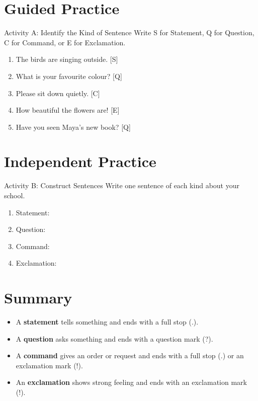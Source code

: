 \section{Guided Practice}
\begin{activitybox}{Activity A: Identify the Kind of Sentence}
Write S for Statement, Q for Question, C for Command, or E for Exclamation.
\begin{enumerate}
    \item The birds are singing outside. [S]
    \item What is your favourite colour? [Q]
    \item Please sit down quietly. [C]
    \item How beautiful the flowers are! [E]
    \item Have you seen Maya's new book? [Q]
\end{enumerate}
\end{activitybox}

\section{Independent Practice}
\begin{activitybox}{Activity B: Construct Sentences}
Write one sentence of each kind about your school.
\begin{enumerate}
    \item Statement: \underline{\hspace{10cm}}
    \item Question: \underline{\hspace{10cm}}
    \item Command: \underline{\hspace{10cm}}
    \item Exclamation: \underline{\hspace{10cm}}
\end{enumerate}
\end{activitybox}

\section{Summary}
\begin{summarybox}
    \begin{itemize}
        \item A \textbf{statement} tells something and ends with a full stop (.).
        \item A \textbf{question} asks something and ends with a question mark (?).
        \item A \textbf{command} gives an order or request and ends with a full stop (.) or an exclamation mark (!).
        \item An \textbf{exclamation} shows strong feeling and ends with an exclamation mark (!).
    \end{itemize}
\end{summarybox}